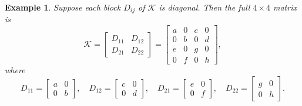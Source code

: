\documentclass{article}
\newcommand{\K}{\mathcal{K}}
\newtheorem{example}{Example}
\begin{document}
\begin{example}
  Suppose each block $D_{ij}$ of $\K$ is diagonal. Then the full $4\times4$ matrix is
  \[
    \K = \begin{bmatrix}
      D_{11} & D_{12} \\
      D_{21} & D_{22}
    \end{bmatrix} =
    \begin{bmatrix}
      a & 0 & c & 0 \\
      0 & b & 0 & d \\
      e & 0 & g & 0 \\
      0 & f & 0 & h
    \end{bmatrix},
  \]
  where
  \[
    D_{11} = \begin{bmatrix} a & 0 \\ 0 & b \end{bmatrix}, \quad
    D_{12} = \begin{bmatrix} c & 0 \\ 0 & d \end{bmatrix}, \quad
    D_{21} = \begin{bmatrix} e & 0 \\ 0 & f \end{bmatrix}, \quad
    D_{22} = \begin{bmatrix} g & 0 \\ 0 & h \end{bmatrix}.
  \]


\end{example}
\end{document}
